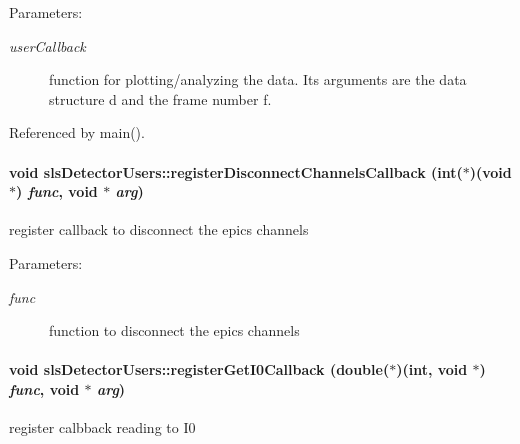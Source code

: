 \begin{Desc}
\item[Parameters:]
\begin{description}
\item[{\em user\-Callback}]function for plotting/analyzing the data. Its arguments are the data structure d and the frame number f. \end{description}
\end{Desc}


Referenced by main().\hypertarget{classslsDetectorUsers_a94dd8fce8548ba8e79201ec50fe27d6}{
\paragraph[registerDisconnectChannelsCallback]{\setlength{\rightskip}{0pt plus 5cm}void sls\-Detector\-Users::register\-Disconnect\-Channels\-Callback (int($\ast$)(void $\ast$) {\em func}, void $\ast$ {\em arg})}\hfill}
\label{classslsDetectorUsers_a94dd8fce8548ba8e79201ec50fe27d6}


register callback to disconnect the epics channels 

\begin{Desc}
\item[Parameters:]
\begin{description}
\item[{\em func}]function to disconnect the epics channels \end{description}
\end{Desc}
\hypertarget{classslsDetectorUsers_1969785197030aa8e2d3c3d48a9cb45c}{
\paragraph[registerGetI0Callback]{\setlength{\rightskip}{0pt plus 5cm}void sls\-Detector\-Users::register\-Get\-I0Callback (double($\ast$)(int, void $\ast$) {\em func}, void $\ast$ {\em arg})}\hfill}
\label{classslsDetectorUsers_1969785197030aa8e2d3c3d48a9cb45c}


register calbback reading to I0 

